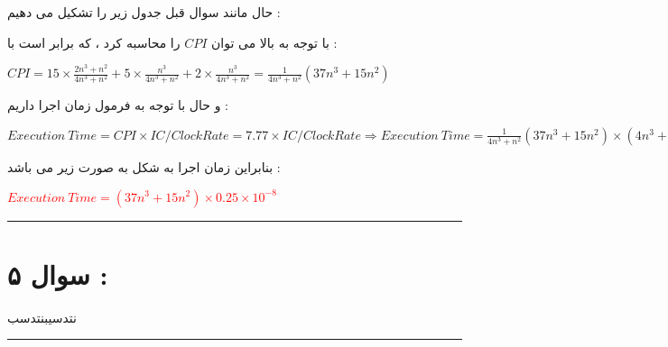 \documentclass{article}
\begin{document}
حال مانند سوال قبل جدول زیر را تشکیل می دهیم  : 
\begin{center}
	\begin{table}[h]
		\centering
	\end{table}
\end{center}
با توجه به بالا می توان 
$CPI$
را محاسبه کرد ، که برابر است با   : 
\begin{center}
	$ CPI =15 \times \frac{2n^3+n^2}{4n^3+n^2} +5 \times  \frac{n^3}{4n^3+n^2} + 2 \times  \frac{n^3}{4n^3+n^2}  = \frac{1}{4n^3+n^2}(37n^3+15n^2) $
\end{center}
و حال با توجه به فرمول زمان اجرا داریم : 
\begin{center}
	$ Execution \ Time  = CPI \times IC /  Clock Rate =7.77  \times IC  / Clock Rate \Rightarrow Execution \ Time  =  \frac{1}{4n^3+n^2}(37n^3+15n^2) \times (4n^3+n^2)\times 0.25 \times 10^{-8}$
\end{center}
بنابراین زمان اجرا به شکل به صورت زیر می باشد   : 
\begin{center}
	\textcolor{red}{$Execution \ Time = (37n^3+15n^2) \times 0.25 \times 10^{-8}$}
\end{center}
	\hrule
	\section*{سوال ۵  : }
	
	نتدسیبنتدسب
	\hrule
\end{document}
